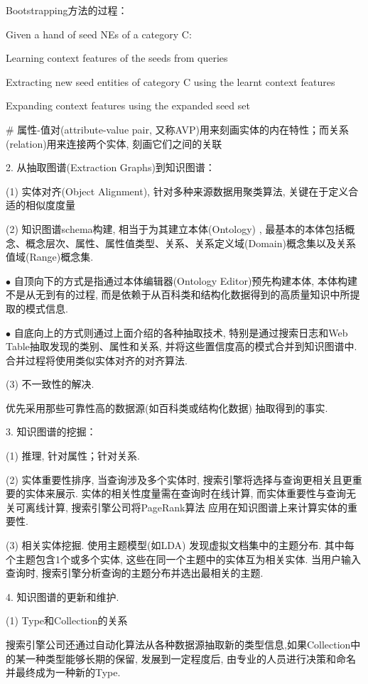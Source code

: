     Bootstrapping方法的过程：

    Given a hand of seed NEs of a category C:

    Learning context features of the seeds from queries

    Extracting new seed entities of category C using the learnt context  features

    Expanding context features using the expanded seed set

\# 属性-值对(attribute-value pair, 又称AVP)用来刻画实体的内在特性；而关系(relation)用来连接两个实体, 刻画它们之间的关联

2. 从抽取图谱(Extraction Graphs)到知识图谱：

(1) 实体对齐(Object Alignment), 针对多种来源数据用聚类算法, 关键在于定义合适的相似度度量

(2) 知识图谱schema构建, 相当于为其建立本体(Ontology) , 最基本的本体包括概念、概念层次、属性、属性值类型、关系、关系定义域(Domain)概念集以及关系值域(Range)概念集.

$\bullet$ 自顶向下的方式是指通过本体编辑器(Ontology Editor)预先构建本体, 本体构建不是从无到有的过程, 而是依赖于从百科类和结构化数据得到的高质量知识中所提取的模式信息.

$\bullet$ 自底向上的方式则通过上面介绍的各种抽取技术, 特别是通过搜索日志和Web Table抽取发现的类别、属性和关系, 并将这些置信度高的模式合并到知识图谱中. 合并过程将使用类似实体对齐的对齐算法.

(3) 不一致性的解决.

优先采用那些可靠性高的数据源(如百科类或结构化数据) 抽取得到的事实.

3. 知识图谱的挖掘：

(1) 推理, 针对属性；针对关系.

(2) 实体重要性排序, 当查询涉及多个实体时, 搜索引擎将选择与查询更相关且更重要的实体来展示. 实体的相关性度量需在查询时在线计算, 而实体重要性与查询无关可离线计算, 搜索引擎公司将PageRank算法 应用在知识图谱上来计算实体的重要性.

(3) 相关实体挖掘. 使用主题模型(如LDA) 发现虚拟文档集中的主题分布. 其中每个主题包含1个或多个实体, 这些在同一个主题中的实体互为相关实体. 当用户输入查询时, 搜索引擎分析查询的主题分布并选出最相关的主题.

4. 知识图谱的更新和维护.

(1) Type和Collection的关系

搜索引擎公司还通过自动化算法从各种数据源抽取新的类型信息,如果Collection中的某一种类型能够长期的保留, 发展到一定程度后, 由专业的人员进行决策和命名并最终成为一种新的Type.

